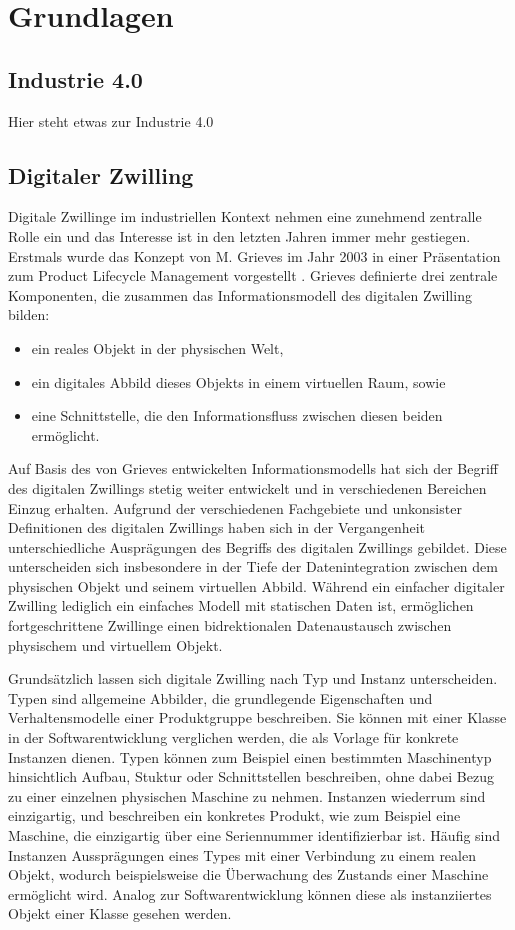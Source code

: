 \section{Grundlagen}
\subsection{Industrie 4.0}
Hier steht etwas zur Industrie 4.0



\subsection{Digitaler Zwilling}
Digitale Zwillinge im industriellen Kontext nehmen eine zunehmend zentralle Rolle ein und das Interesse ist in den letzten Jahren immer mehr gestiegen.
Erstmals wurde das Konzept von M. Grieves im Jahr 2003 in einer Präsentation zum Product Lifecycle Management vorgestellt \cite{DTGrieves}. 
Grieves definierte drei zentrale Komponenten, die zusammen das Informationsmodell des digitalen Zwilling bilden:
\begin{itemize}
    \item ein reales Objekt in der physischen Welt,
    \item ein digitales Abbild dieses Objekts in einem virtuellen Raum, sowie
    \item eine Schnittstelle, die den Informationsfluss zwischen diesen beiden ermöglicht.
\end{itemize}

Auf Basis des von Grieves entwickelten Informationsmodells hat sich der Begriff des digitalen Zwillings stetig weiter entwickelt und in verschiedenen Bereichen Einzug erhalten. 
Aufgrund der verschiedenen Fachgebiete und unkonsister Definitionen des digitalen Zwillings haben sich in der Vergangenheit unterschiedliche Ausprägungen des Begriffs des digitalen Zwillings gebildet.
Diese unterscheiden sich insbesondere in der Tiefe der Datenintegration zwischen dem physischen Objekt und seinem virtuellen Abbild.
Während ein einfacher digitaler Zwilling lediglich ein einfaches Modell mit statischen Daten ist, ermöglichen fortgeschrittene Zwillinge einen bidrektionalen Datenaustausch zwischen physischem und virtuellem Objekt. 

Grundsätzlich lassen sich digitale Zwilling nach Typ und Instanz unterscheiden.
Typen sind allgemeine Abbilder, die grundlegende Eigenschaften und Verhaltensmodelle einer Produktgruppe beschreiben. 
Sie können mit einer Klasse in der Softwarentwicklung verglichen werden, die als Vorlage für konkrete Instanzen dienen.
Typen können zum Beispiel einen bestimmten Maschinentyp hinsichtlich Aufbau, Stuktur oder Schnittstellen beschreiben, ohne dabei Bezug zu einer einzelnen physischen Maschine zu nehmen.
Instanzen wiederrum sind einzigartig, und beschreiben ein konkretes Produkt, wie zum Beispiel eine Maschine, die einzigartig über eine Seriennummer identifizierbar ist.
Häufig sind Instanzen Aussprägungen eines Types mit einer Verbindung zu einem realen Objekt, wodurch beispielsweise die Überwachung des Zustands einer Maschine ermöglicht wird.
Analog zur Softwarentwicklung können diese als instanziiertes Objekt einer Klasse gesehen werden. \cite{ZEISS}

